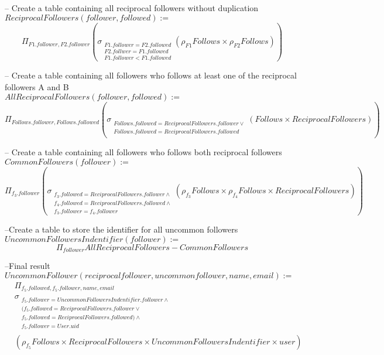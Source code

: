 \documentclass{article}
\newcommand{\var}[1]{\mathit{#1}}
\begin{document}
\begin{enumerate}
{\large


-- Create a table containing all reciprocal followers without duplication \\
$\var{ReciprocalFollowers}(follower,followed) :=$
\[
	\Pi_{F1.follower, F2.follower} 
	\left(
		\sigma_{
			\substack{
				F1.follower = F2.followed\\
				F2.follwer = F1.followed\\
				F1.follower < F1.followed
			} 
		}
		(\rho_{F1} \var{Follows} \times \rho_{F2} \var{Follows})
	\right)
\]


-- Create a table containing all followers who follows at least one of the reciprocal followers A and B \\
$\var{AllReciprocalFollowers}(follower,followed) :=$
\[
	\Pi_{Follows.follower,Follows.followed}
	\left(
		\sigma_{
			\substack{
				Follows.followed = ReciprocalFollowers.follower \lor \\
				Follows.followed = ReciprocalFollowers.followed \\
			}
		}
		(\var{Follows} \times \var{ReciprocalFollowers})
	\right) 
\]


-- Create a table containing all followers who follows both reciprocal followers \\
$\var{CommonFollowers}(follower):=$
\[
	\Pi_{f_3.follower}
	\left(
		\sigma_{
			\substack{
				f_3.followed = ReciprocalFollowers.follower \land \\
				f_4.followed = ReciprocalFollowers.followed \land \\
				f_3.follower = f_4.follower
			}
		}
		(\rho_{f_3} \var{Follows} \times \rho_{f_4} \var{Follows} \times \var{ReciprocalFollowers})
	\right) 
\]


--Create a table to store the identifier for all uncommon followers \\
$\var{UncommonFollowersIndentifier}(follower) := $
\[
	\Pi_{follower} \var{AllReciprocalFollowers} - \var{CommonFollowers}
\]

--Final result \\
$\var{UncommonFollower}(reciprocalfollower, uncommon follower, name, email):=$
\begin{align*}
	&\Pi_{f_5.followed,f_5.follower,name,email}\\
		&\sigma_{
			\substack{
				f_5.follower = UncommonFollowersIndentifier.follower \land \\
				(f_5.followed = ReciprocalFollowers.follower \lor \\
				f_5.followed = ReciprocalFollowers.followed) \land \\
				f_5.follower = User.uid
			}
		}\\
		&(\rho_{f_5} \var{Follows} \times \var{ReciprocalFollowers} \times \var{UncommonFollowersIndentifier} \times \var{user})\\
\end{align*}

}
\end{enumerate}
\end{document}
